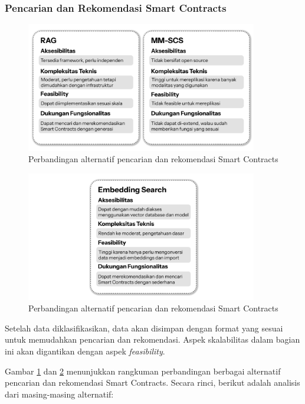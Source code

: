 \subsubsection{Pencarian dan Rekomendasi Smart Contracts}

\begin{figure}[ht]
	\centering
	\includegraphics[width=0.9\textwidth]{resources/chapter-3/pencarian-1.png}
	\caption{Perbandingan alternatif pencarian dan rekomendasi Smart Contracts}
	\label{image:pencarian-1}
\end{figure}

\begin{figure}[ht]
	\centering
	\includegraphics[width=0.9\textwidth]{resources/chapter-3/pencarian-2.png}
	\caption{Perbandingan alternatif pencarian dan rekomendasi Smart Contracts}
	\label{image:pencarian-2}
\end{figure}

Setelah data diklasifikasikan, data akan disimpan dengan format yang sesuai untuk memudahkan pencarian dan rekomendasi. Aspek skalabilitas dalam bagian ini akan digantikan dengan aspek \textit{feasibility}.

Gambar \ref{image:pencarian-1} dan \ref{image:pencarian-2} menunjukkan rangkuman perbandingan berbagai alternatif pencarian dan rekomendasi Smart Contracts. Secara rinci, berikut adalah analisis dari masing-masing alternatif:

